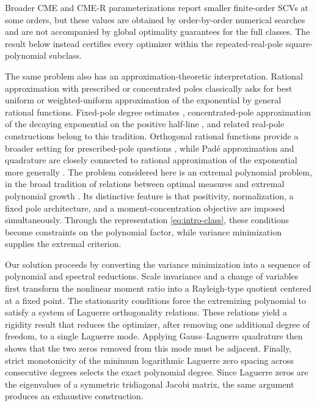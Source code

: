\documentclass[11pt]{article}
\numberwithin{equation}{section}
\theoremstyle{definition}
\theoremstyle{remark}
\begin{document}
Broader CME and CME-R parameterizations report smaller finite-order SCVs at
some orders, but these values are obtained by order-by-order numerical
searches and are not accompanied by global optimality guarantees for the
full classes. The result below instead certifies every optimizer within the
repeated-real-pole square-polynomial subclass.

The same problem also has an approximation-theoretic interpretation.
Rational approximation with prescribed or concentrated poles classically
asks for best uniform or weighted-uniform approximation of the exponential
by general rational functions. Fixed-pole degree estimates
\cite{anderssonganelius1977}, concentrated-pole approximation of the decaying exponential on the positive half-line \cite{andersson1981}, and related real-pole constructions
\cite{borwein1983} belong to
this tradition. Orthogonal rational functions provide a broader setting
for prescribed-pole questions \cite{bultheeletal1999}, while Pad\'e
approximation and quadrature are closely connected to rational approximation
of the exponential more generally
\cite{bakergravesmorris,prevostrivoal2007}. The problem considered here is an extremal polynomial problem, in the broad tradition of relations between optimal measures and extremal polynomial growth \cite{boslevenbergortega2021}. Its distinctive feature is that positivity, normalization, a fixed pole architecture, and a moment-concentration objective are imposed simultaneously. Through the representation \eqref{eq:intro-class}, these conditions become constraints on the polynomial factor, while variance minimization supplies the extremal criterion.


Our solution proceeds by converting the variance minimization into a
sequence of polynomial and spectral reductions. Scale invariance and a
change of variables first transform the nonlinear moment ratio into a
Rayleigh-type quotient centered at a fixed point. The stationarity
conditions force the extremizing polynomial to satisfy a system of
Laguerre orthogonality relations. These relations yield a rigidity result that reduces the optimizer, after removing one additional degree of freedom, to a single Laguerre mode. Applying Gauss--Laguerre quadrature then shows that the two zeros removed from this mode must be adjacent. Finally, strict monotonicity of the minimum logarithmic Laguerre zero spacing across consecutive degrees selects the exact polynomial degree. Since Laguerre zeros are the eigenvalues of a
symmetric tridiagonal Jacobi matrix, the same argument produces an
exhaustive construction.
\end{document}
